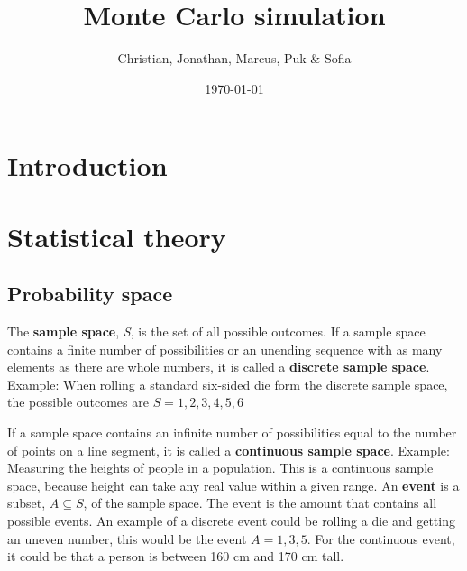 \documentclass{article}
\title{Monte Carlo simulation}
\author{Christian, Jonathan, Marcus, Puk & Sofia }
\date{\today}
\begin{document}
	\maketitle
	\newpage
	\tableofcontents
	\newpage
	\section{Introduction}
	\newpage
	\section{Statistical theory}
	\subsection{Probability space}
 
	The \textbf{sample space}, \textit{S}, is the set of all possible outcomes.
	\newline
	If a sample space contains a finite number of possibilities or an unending sequence with as many elements as there are whole numbers, it is called a \textbf{discrete sample space}.
	\newline
Example: When rolling a standard six-sided die form the discrete sample space, the possible outcomes are $S={1,2,3,4,5,6}$ 
 \newline

	If a sample space contains an infinite number of possibilities equal to the number of points on a line segment, it is called a \textbf{continuous sample space}.
	\break
Example: Measuring the heights of people in a population. This is a continuous sample space, because height can take any real value within a given range. 
	\newline
	An \textbf{event} is a subset, $A\subseteq S$, of the sample space. The event is the amount that contains all possible events.
	An example of a discrete event could be rolling a die and getting an uneven number, this would be the event $A={1,3,5}$.
	\newline 
For the continuous event, it could be that a person is between 160 cm and 170 cm tall.
\newline
	
\end{document}
